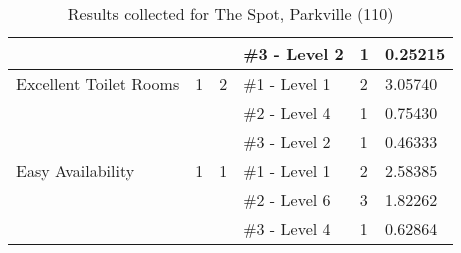 \begin{table}[H]
{\begin{tabular}{|l|l|l|l|l|l|}
                         &                            &                                     & \#3   - Level 2  & 1             & 0.25215         \\ \hline
Excellent   Toilet Rooms & 1                          & 2                                   & \#1   - Level 1  & 2             & 3.05740         \\ \hline
                         &                            &                                     & \#2   - Level 4  & 1             & 0.75430         \\ \hline
                         &                            &                                     & \#3   - Level 2  & 1             & 0.46333         \\ \hline
Easy   Availability      & 1                          & 1                                   & \#1   - Level 1  & 2             & 2.58385         \\ \hline
                         &                            &                                     & \#2   - Level 6  & 3             & 1.82262         \\ \hline
                         &                            &                                     & \#3   - Level 4  & 1             & 0.62864         \\ \hline
\end{tabular}
}
\caption{Results collected for The Spot, Parkville (110)}
\label{appendix:spot_floor_to}
\end{table}

